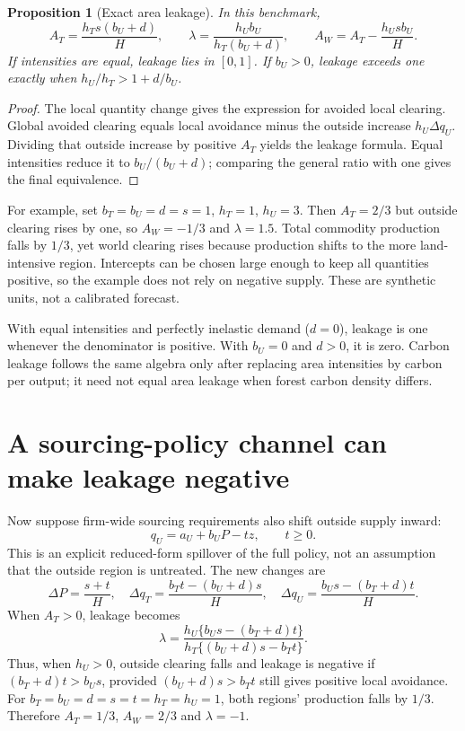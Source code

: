 \documentclass[11pt]{article}
\newtheorem{proposition}{Proposition}
\begin{document}
\begin{proposition}[Exact area leakage]
In this benchmark,
\[
 A_T=\frac{h_Ts(b_U+d)}H,\qquad
 \lambda=\frac{h_Ub_U}{h_T(b_U+d)},\qquad
 A_W=A_T-\frac{h_Usb_U}H.
\]
If intensities are equal, leakage lies in $[0,1]$. If $b_U>0$, leakage exceeds one exactly when $h_U/h_T>1+d/b_U$.
\end{proposition}
\begin{proof}
The local quantity change gives the expression for avoided local clearing. Global avoided clearing equals local avoidance minus the outside increase $h_U\Delta q_U$. Dividing that outside increase by positive $A_T$ yields the leakage formula. Equal intensities reduce it to $b_U/(b_U+d)$; comparing the general ratio with one gives the final equivalence.
\end{proof}

For example, set $b_T=b_U=d=s=1$, $h_T=1$, $h_U=3$. Then $A_T=2/3$ but outside clearing rises by one, so $A_W=-1/3$ and $\lambda=1.5$. Total commodity production falls by $1/3$, yet world clearing rises because production shifts to the more land-intensive region. Intercepts can be chosen large enough to keep all quantities positive, so the example does not rely on negative supply. These are synthetic units, not a calibrated forecast.

With equal intensities and perfectly inelastic demand ($d=0$), leakage is one whenever the denominator is positive. With $b_U=0$ and $d>0$, it is zero. Carbon leakage follows the same algebra only after replacing area intensities by carbon per output; it need not equal area leakage when forest carbon density differs.

\section*{A sourcing-policy channel can make leakage negative}
Now suppose firm-wide sourcing requirements also shift outside supply inward:
\[
 q_U=a_U+b_UP-tz,\qquad t\geq0.
\]
This is an explicit reduced-form spillover of the full policy, not an assumption that the outside region is untreated. The new changes are
\[
 \Delta P=\frac{s+t}{H},\quad
 \Delta q_T=\frac{b_Tt-(b_U+d)s}{H},\quad
 \Delta q_U=\frac{b_Us-(b_T+d)t}{H}.
\]
When $A_T>0$, leakage becomes
\[
 \lambda=
 \frac{h_U\{b_Us-(b_T+d)t\}}
      {h_T\{(b_U+d)s-b_Tt\}}.
\]
Thus, when $h_U>0$, outside clearing falls and leakage is negative if
$(b_T+d)t>b_Us$, provided $(b_U+d)s>b_Tt$ still gives positive local avoidance. For $b_T=b_U=d=s=t=h_T=h_U=1$, both regions' production falls by $1/3$. Therefore $A_T=1/3$, $A_W=2/3$ and $\lambda=-1$.
\end{document}
